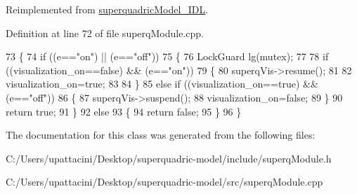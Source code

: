 Reimplemented from \mbox{\hyperlink{classsuperquadricModel__IDL_a651c741e9b01b25d46be96b06b91011d}{superquadric\+Model\+\_\+\+I\+DL}}.



Definition at line 72 of file superq\+Module.\+cpp.


\begin{DoxyCode}
73 \{
74     \textcolor{keywordflow}{if} ((e==\textcolor{stringliteral}{"on"}) || (e==\textcolor{stringliteral}{"off"}))
75     \{
76         LockGuard lg(mutex);
77 
78         \textcolor{keywordflow}{if} ((visualization_on==\textcolor{keyword}{false}) && (e==\textcolor{stringliteral}{"on"}))
79         \{
80             superqVis->resume();
81 
82             visualization_on=\textcolor{keyword}{true};
83 
84         \}
85         \textcolor{keywordflow}{else} \textcolor{keywordflow}{if} ((visualization_on==\textcolor{keyword}{true}) && (e==\textcolor{stringliteral}{"off"}))
86         \{
87             superqVis->suspend();
88             visualization_on=\textcolor{keyword}{false};
89         \}
90         \textcolor{keywordflow}{return} \textcolor{keyword}{true};
91     \}
92     \textcolor{keywordflow}{else}
93     \{
94         \textcolor{keywordflow}{return} \textcolor{keyword}{false};
95     \}
96 \}
\end{DoxyCode}


The documentation for this class was generated from the following files\+:\begin{DoxyCompactItemize}
\item 
C\+:/\+Users/upattacini/\+Desktop/superquadric-\/model/include/superq\+Module.\+h\item 
C\+:/\+Users/upattacini/\+Desktop/superquadric-\/model/src/superq\+Module.\+cpp\end{DoxyCompactItemize}
